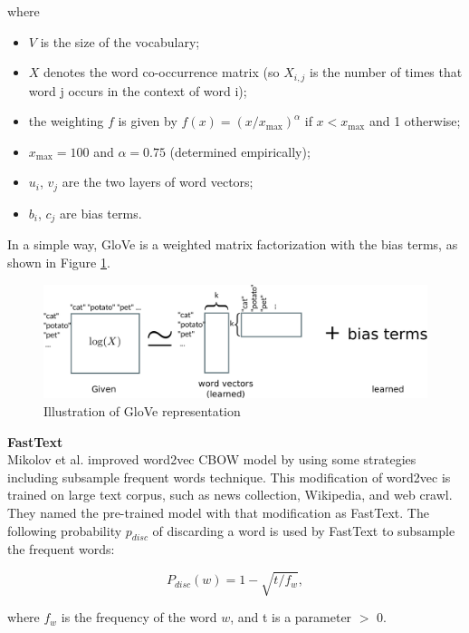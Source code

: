 \noindent where
\begin{itemize}
\item $V$ is the size of the vocabulary;
\item $X$ denotes the word co-occurrence matrix (so $X_{i,j}$ is the number of
times that word j occurs in the context of word i);
\item the weighting $f$ is given by $f(x) = (x / x_{\text{max}})^\alpha$ if $x
< x_{\text{max}}$ and 1 otherwise;
\item $x_{\text{max}} = 100$ and $\alpha = 0.75$ (determined empirically);
\item $u_i$, $v_j$ are the two layers of word vectors;
\item $b_i$, $c_j$ are bias terms.
\end{itemize}

\noindent In a simple way, GloVe is a weighted matrix factorization with the
bias terms, as shown in Figure \ref{fig:glove}. \\

\begin{figure}
\centering
\includegraphics[width=5in]{../fig/glove.pdf}
\caption{Illustration of GloVe representation}
\label{fig:glove}
\end{figure}

\noindent \textbf{FastText} \\
Mikolov et al. \cite{Mikolov2019} improved word2vec CBOW model by using some
strategies including subsample frequent words technique. This modification of
word2vec is trained on large text corpus, such as news collection, Wikipedia,
and web crawl. They named the pre-trained model with that modification as
FastText.  The following probability $p_{disc}$ of discarding a word is used by
FastText to subsample the frequent words:

\begin{equation}
P_{disc} (w) = 1 - \sqrt{t/f_w},
\label{eq:fastext}
\end{equation}

\noindent where $f_w$ is the frequency of the word $w$, and t is a parameter
$>$ 0.

